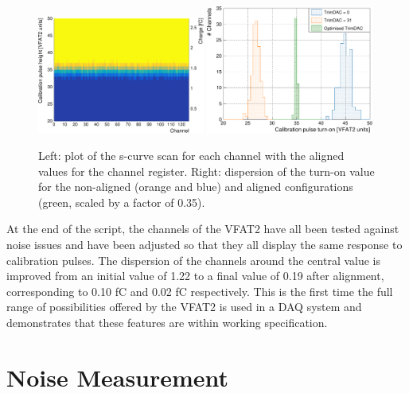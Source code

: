       \begin{figure}[h!]
        \centering
        \includegraphics[width=0.49\textwidth]{img/plots/cSCurve_ChannelVCal_Trimed-crop}
        \includegraphics[width=0.49\textwidth]{img/plots/cSCurve_ChannelVCal_Disp-crop}
        \caption{Left: plot of the s-curve scan for each channel with the aligned values for the channel register. Right: dispersion of the turn-on value for the non-aligned (orange and blue) and aligned configurations (green, scaled by a factor of 0.35).}
        \label{fig:II-4-trimed}
      \end{figure}

      At the end of the script, the channels of the VFAT2 have all been tested against noise issues and have been adjusted so that they all display the same response to calibration pulses. The dispersion of the channels around the central value is improved from an initial value of 1.22 to a final value of 0.19 after alignment, corresponding to 0.10 fC and 0.02 fC respectively. This is the first time the full range of possibilities offered by the VFAT2 is used in a DAQ system and demonstrates that these features are within working specification.

    \section{Noise Measurement}


